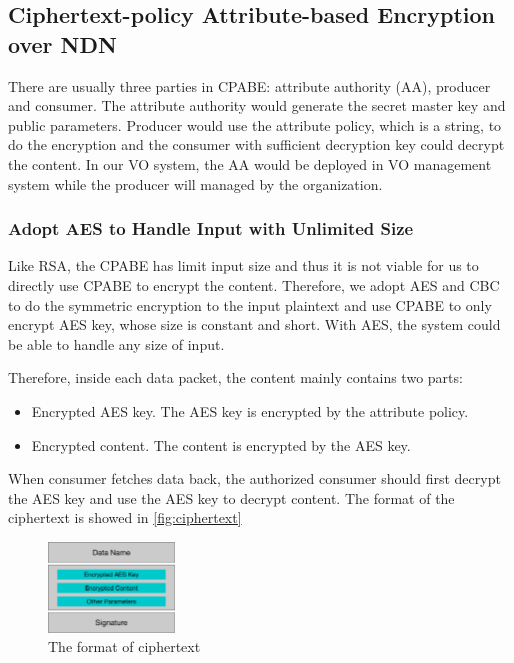 \subsection{Ciphertext-policy Attribute-based Encryption over NDN}

There are usually three parties in CPABE: attribute authority (AA), producer and consumer.
The attribute authority would generate the secret master key and public parameters.
Producer would use the attribute policy, which is a string, to do the encryption and the consumer with sufficient decryption key could decrypt the content.
In our VO system, the AA would be deployed in VO management system while the producer will managed by the organization.

\subsubsection{Adopt AES to Handle Input with Unlimited Size}
Like RSA, the CPABE has limit input size and thus it is not viable for us to directly use CPABE to encrypt the content.
Therefore, we adopt AES and CBC to do the symmetric encryption to the input plaintext and use CPABE to only encrypt AES key, whose size is constant and short.
With AES, the system could be able to handle any size of input.

Therefore, inside each data packet, the content mainly contains two parts:
\begin{itemize}
\item Encrypted AES key. The AES key is encrypted by the attribute policy.
\item Encrypted content. The content is encrypted by the AES key.
\end{itemize}
When consumer fetches data back, the authorized consumer should first decrypt the AES key and use the AES key to decrypt content.
The format of the ciphertext is showed in \ref{fig:ciphertext}

\begin{figure}[H]
  \centering
  \includegraphics[width=0.3\textwidth]{figures/ciphertext}
  \vspace{-3mm}
  \caption{The format of ciphertext}
  \label{fig:token}
\end{figure}


